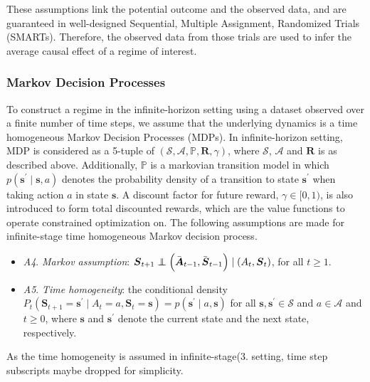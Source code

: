 \documentclass{article}
\newcommand{\bs}{ \boldsymbol}
\newcommand{\mb}{\mathbb}
\newcommand{\ml}{\mathcal}
\newcommand{\br}{\bar}
\newcommand{\lt}{\left}
\newcommand{\rt}{\right}
\newcommand\indep{\protect\mathpalette{\protect\independenT}{\perp}}
\def\independenT#1#2{\mathrel{\rlap{$#1#2$}\mkern2mu{#1#2}}}
\begin{document}
These assumptions link the potential outcome and the observed data, and are guaranteed in well-designed Sequential, Multiple Assignment, Randomized Trials (SMARTs).  Therefore, the observed data from those trials are used to infer the average causal effect of a regime of interest.  

\subsubsection*{Markov Decision Processes}
To construct a regime in the infinite-horizon setting using a dataset observed over a finite number of time steps, we assume that the underlying dynamics is a time homogeneous Markov Decision Processes (MDPs). In infinite-horizon setting, MDP is considered as a 5-tuple of $(\bs{\ml{S}}, \ml{A}, \mb{P}, \bs{R}, \gamma)$, where $\bs{\ml{S}}$, $\ml{A}$ and $\bs{R}$ is as described above. Additionally, $\mb{P}$ is a markovian transition model in which $p(\bs{s}^{\prime} \mid \bs{s}, a)$ denotes the probability density of a transition to state $\bs{s}^{\prime}$ when taking action $a$ in state $\bs{s}$.  A discount factor for future reward, $\gamma \in [0, 1)$, is also introduced to form total discounted rewards, which are the value functions to operate constrained optimization on. The following assumptions are made for infinite-stage time homogeneous Markov decision process.
\begin{itemize}         
	\item \textit{A4}. \textit{Markov assumption}: $\bs{S}_{t+1} \indep \lt( \br{\bs{A}}_{t-1}, \br{\bs{S}}_{t-1} \rt) \mid \lt( A_{t}, \bs{S}_{t} \rt) $, for all $t \ge 1$.
	\item \textit{A5}. \textit{Time homogeneity}: the conditional density	$P_t(\bs{S}_{t+1} = \bs{s}^{\prime} \mid A_{t} = a, \bs{S}_{t} = \bs{s} ) = p(\bs{s}^{\prime} \mid a, \bs{s})$ for all $\bs{s} , \bs{s}^{\prime} \in \bs{\mathcal{S}}$ and $a \in \mathcal{A}$ and $t \ge 0$, where $\bs{s}$ and $\bs{s}^{\prime}$ denote the current state and the next state, respectively. 
\end{itemize}
As the time homogeneity is assumed in infinite-stage(3. setting, time step subscripts maybe dropped for simplicity.
\end{document}
